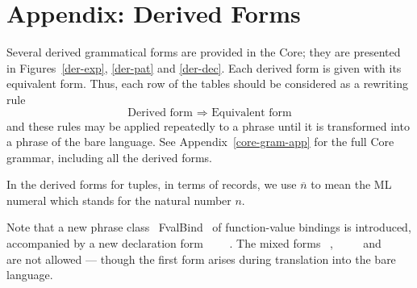 %

\section{Appendix: Derived Forms}
\label{derived-forms-app}
Several derived grammatical forms are provided in the Core; they are presented
in Figures~\ref{der-exp}, \ref{der-pat} and \ref{der-dec}. Each derived form is
given with its equivalent form. Thus, each row of the tables should be
considered as a rewriting rule
\[ \mbox{Derived form \ $\Longrightarrow$\  Equivalent form} \]
and these rules may be applied repeatedly to a phrase until it is transformed
into a phrase of the bare language.
See Appendix~\ref{core-gram-app} for the full Core grammar, including all the
derived forms.

In the derived forms for tuples, in terms of records, we use $\overline{n}$ to
mean the ML numeral which stands for the natural number $n$.

Note that a new phrase class ~FvalBind~ of function-value bindings is introduced,
accompanied by a new declaration form ~\FUN\ \tyvarseq\ \fvalbind~. The mixed forms
\REPL{~\VAL\ \REC\ \tyvarseq\ \fvalbind~}{~\VAL\ \tyvarseq\ \REC\ \fvalbind}~,
~\VAL\ \tyvarseq\ \fvalbind~
and ~\FUN\ \tyvarseq\ \valbind~ are not
allowed --- though the first form arises during translation into the bare
language.



